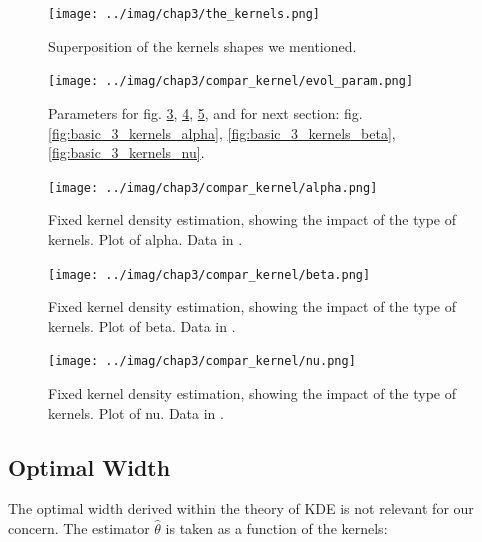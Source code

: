 \documentclass[11pt]{book}
\begin{document}
\begin{figure}
\centering
\texttt{[image: ../imag/chap3/the\_kernels.png]}
\caption{Superposition of the kernels shapes we mentioned.}
\label{fig:kernels_list}
\end{figure}


\begin{figure}
\centering
\texttt{[image: ../imag/chap3/compar\_kernel/evol\_param.png]}
\caption{Parameters for fig. \ref{fig:basic_5_kernels_alpha}, \ref{fig:basic_5_kernels_beta}, \ref{fig:basic_5_kernels_nu}, and for next section: fig. \ref{fig:basic_3_kernels_alpha}, \ref{fig:basic_3_kernels_beta}, \ref{fig:basic_3_kernels_nu}. }
\label{fig:evol_choice_basic}
\end{figure}


\begin{figure}
\centering
\texttt{[image: ../imag/chap3/compar\_kernel/alpha.png]}
\caption{Fixed kernel density estimation, showing the impact of the type of kernels. Plot of alpha. Data in \protect {}.}
\label{fig:basic_5_kernels_alpha}
\end{figure}

\begin{figure}
\centering
\texttt{[image: ../imag/chap3/compar\_kernel/beta.png]}
\caption{Fixed kernel density estimation, showing the impact of the type of kernels. Plot of beta. Data in \protect {}.}
\label{fig:basic_5_kernels_beta}
\end{figure}

\begin{figure}
\centering
\texttt{[image: ../imag/chap3/compar\_kernel/nu.png]}
\caption{Fixed kernel density estimation, showing the impact of the type of kernels. Plot of nu. Data in \protect {}.}
\label{fig:basic_5_kernels_nu}
\end{figure}







\subsection{Optimal Width}
\label{subsection:optimal_width}


The optimal width derived within the theory of KDE is not relevant for our concern. The estimator $\widehat{\theta}$ is taken as a function of the kernels:
\end{document}
